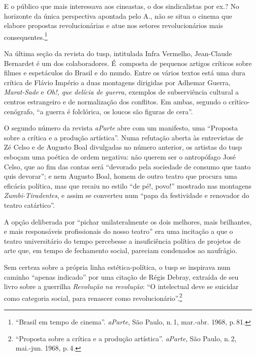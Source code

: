 \startblockquote
E o público que mais interessava aos cineastas, o dos sindicalistas por
ex.? No horizonte da única perspectiva apontada pelo A., não se situa o
cinema que elabore propostas revolucionárias e atue nos setores
revolucionários mais consequentes.\footnote{“Brasil em tempo de cinema”.
  {\it aParte}, São Paulo, n.\,1, mar.-abr. 1968, p.\,81.}
\stopblockquote

Na última seção da revista do {\sc tusp}, intitulada Infra Vermelho,
Jean-Claude Bernardet é um dos colaboradores. É~composta de pequenos
artigos críticos sobre filmes e espetáculos do Brasil e do mundo. Entre
os vários textos está uma dura crítica de Flávio Império a duas
montagens dirigidas por Adhemar Guerra, {\it Marat-Sade} e {\it Oh!, que
delícia de guerra,} exemplos de subserviência cultural a centros
estrangeiro e de normalização dos conflitos. Em ambas, segundo
o crítico-cenógrafo, “a guerra é folclórica, os loucos são figuras de
cera”.


O segundo número da revista {\it aParte} abre com um manifesto, uma
“Proposta sobre a crítica e a produção artística”. Numa refutação
aberta às entrevistas de Zé Celso e de Augusto Boal divulgadas no número
anterior, os artistas do {\sc tusp} esboçam uma poética de ordem negativa: não
querem ser o antropófago José Celso, que ao fim das contas será
“devorado pela sociedade de consumo que tanto quis devorar”; e nem
Augusto Boal, homem de outro teatro que procura uma eficácia política,
mas que recaiu no estilo “de pé!, povo!” mostrado nas montagens
{\it Zumbi-Tiradentes}, e assim se converteu num “papa da festividade e
renovador do teatro catártico”.

A opção deliberada por “pichar unilateralmente os dois melhores, mais
brilhantes, e mais responsáveis profissionais do nosso teatro” era uma
incitação a que o teatro universitário do tempo percebesse a
insuficiência política de projetos de arte que, em tempo de fechamento
social, pareciam condenados ao naufrágio.

Sem certeza sobre a própria linha estética-política, o {\sc tusp} se inspirava
num caminho “apenas indicado” por uma citação de Régis Debray, extraída
de seu livro sobre a guerrilha {\it Revolução na revolução}: “O
intelectual deve se suicidar como categoria social, para renascer como
revolucionário”.\footnote{“Proposta sobre a crítica e a produção
  artística”. {\it aParte}, São Paulo, n.\,2, mai.-jun. 1968, p.\,4.}

